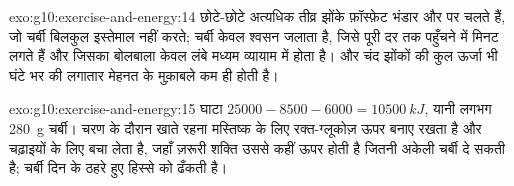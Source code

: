 \begin{solution}{exo:g10:exercise-and-energy:14}
छोटे-छोटे अत्यधिक तीव्र झोंके फ़ॉस्फ़ेट भंडार और  पर चलते हैं, जो
चर्बी बिलकुल इस्तेमाल नहीं करते; चर्बी केवल श्वसन जलाता है, जिसे पूरी दर
तक पहुँचने में मिनट लगते हैं और जिसका बोलबाला केवल लंबे मध्यम व्यायाम में
होता है। और चंद झोंकों की कुल ऊर्जा भी घंटे भर की लगातार मेहनत के मुक़ाबले
कम ही होती है।
\end{solution}

\begin{solution}{exo:g10:exercise-and-energy:15}
घाटा $25000 - 8500 - 6000 = \qty{10500}{kJ}$, यानी लगभग \qty{280}{g}
चर्बी। चरण के दौरान खाते रहना मस्तिष्क के लिए रक्त-ग्लूकोज़ ऊपर बनाए
रखता है और चढ़ाइयों के लिए  बचा लेता है, जहाँ ज़रूरी शक्ति उससे
कहीं ऊपर होती है जितनी अकेली चर्बी दे सकती है; चर्बी दिन के ठहरे हुए
हिस्से को ढँकती है।
\end{solution}

